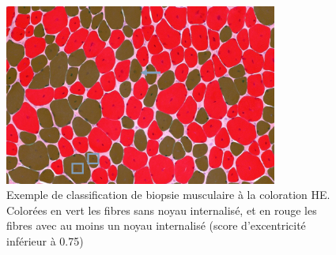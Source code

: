 \begin{figure}[!ht]
 \centering
 \includegraphics[width=0.8\textwidth]{figures/he_paint.png}
 \caption[Exemple de classification de biopsie musculaire à la coloration HE]{Exemple de classification de biopsie musculaire à la coloration HE. Colorées en vert les fibres sans noyau internalisé, et en rouge les fibres avec au moins un noyau internalisé (score d'excentricité inférieur à 0.75)}
 \label{fig:he_paint}
\end{figure}


